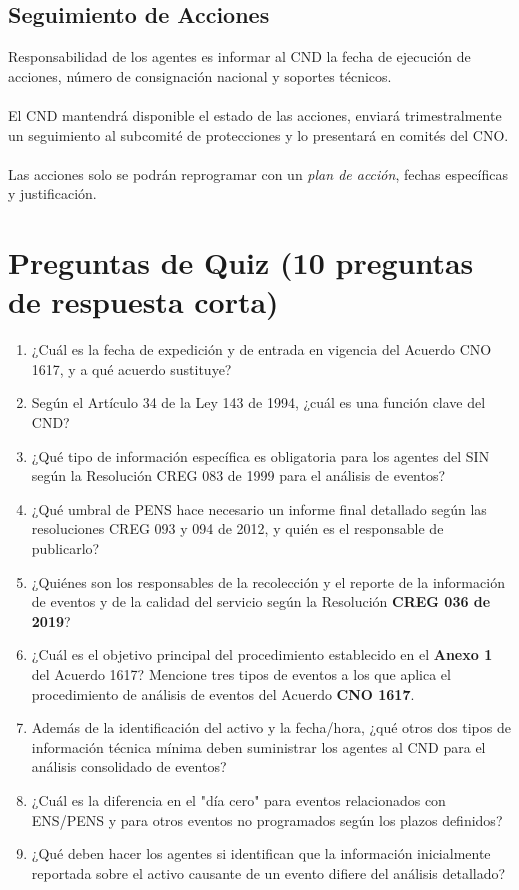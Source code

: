 \documentclass[a5paper]{book}%
\begin{document}
\subsection{Seguimiento de Acciones}

Responsabilidad de los agentes es informar al CND la fecha de ejecución de acciones, número de consignación nacional y soportes técnicos.\\\\
El CND mantendrá disponible el estado de las acciones, enviará trimestralmente un seguimiento al subcomité de protecciones y lo presentará en comités del CNO.\\\\
Las acciones solo se podrán reprogramar con un \textit{plan de acción}, fechas específicas y justificación.

\section{Preguntas de Quiz (10 preguntas de respuesta corta)}

\begin{enumerate}
	\item ¿Cuál es la fecha de expedición y de entrada en vigencia del Acuerdo CNO 1617, y a qué acuerdo sustituye?
	\item Según el Artículo 34 de la Ley 143 de 1994, ¿cuál es una función clave del CND?
	\item ¿Qué tipo de información específica es obligatoria para los agentes del \ac{SIN} según la Resolución CREG 083 de 1999 para el análisis de eventos?
	\item ¿Qué umbral de \ac{PENS} hace necesario un informe final detallado según las resoluciones CREG 093 y 094 de 2012, y quién es el responsable de publicarlo?
	\item ¿Quiénes son los responsables de la recolección y el reporte de la información de eventos y de la calidad del servicio según la Resolución \textbf{CREG 036 de 2019}?
	\item ¿Cuál es el objetivo principal del procedimiento establecido en el \textbf{Anexo 1} del Acuerdo 1617?
	Mencione tres tipos de eventos a los que aplica el procedimiento de análisis de eventos del Acuerdo \textbf{CNO 1617}.
	\item Además de la identificación del activo y la fecha/hora, ¿qué otros dos tipos de información técnica mínima deben suministrar los agentes al \ac{CND} para el análisis consolidado de eventos?
	\item ¿Cuál es la diferencia en el "día cero" para eventos relacionados con \ac{ENS}/\ac{PENS} y para otros eventos no programados según los plazos definidos?
	\item ¿Qué deben hacer los agentes si identifican que la información inicialmente reportada sobre el activo causante de un evento difiere del análisis detallado?
\end{enumerate}
\end{document}
